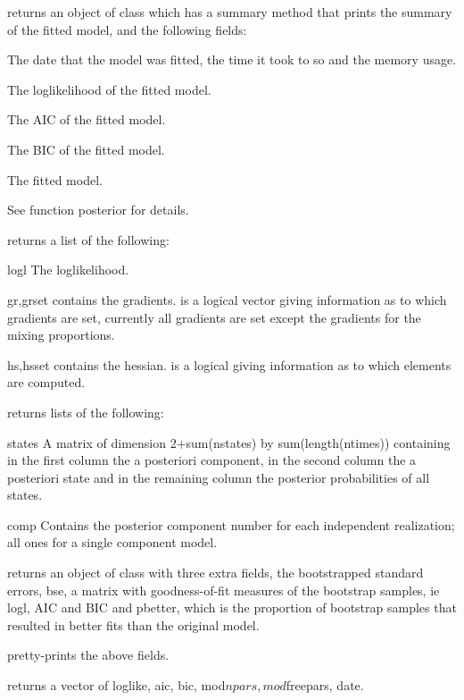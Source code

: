 \documentclass[a4paper]{book}
\begin{document}
\begin{Value}
 returns an object of class  which has a summary
method that prints the summary of the fitted model, and the following fields:

\begin{ldescription}
\item[\code{date,timeUsed,totMem}] The date that the model was fitted, the
time it took to so and the memory usage.
\item[\code{loglike}] The loglikelihood of the fitted model.
\item[\code{aic}] The AIC of the fitted model.
\item[\code{bic}] The BIC of the fitted model.
\item[\code{mod}] The fitted model.
\item[\code{post}] See function posterior for details.

 returns a list of the following: 

\item[logl] The loglikelihood.

\item[gr,grset]  contains the gradients.  is a logical vector
giving information as to which gradients are set, currently all gradients are set 
except the gradients for the mixing proportions.

\item[hs,hsset]  contains the hessian.  is a logical giving 
information as to which elements are computed.

 returns lists of the following: 

\item[states] A matrix of dimension 2+sum(nstates) by sum(length(ntimes)) containing 
in the first column the a posteriori component, in the second column the a posteriori 
state and in the remaining column the posterior probabilities of all states.

\item[comp] Contains the posterior component number for each independent
realization; all ones for a single component model.

 returns an object of class  with three extra fields,
the bootstrapped standard errors, bse, a matrix  with goodness-of-fit measures
of the bootstrap samples, ie logl, AIC and BIC and pbetter, which is the 
proportion of bootstrap samples that resulted in better fits than the original
model. 

 pretty-prints the above fields.

 returns a vector of loglike, aic, bic, mod$npars,
mod$freepars, date.
\end{ldescription}
\end{Value}
\end{document}
